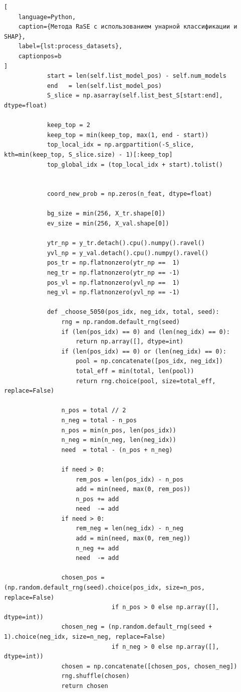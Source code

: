 \documentclass[12pt,a4paper]{article}
\begin{document}
\begin{lstlisting}[
    language=Python,
    caption={Метода RaSE с использованием унарной классификации и SHAP},
    label={lst:process_datasets},
    captionpos=b
]
            start = len(self.list_model_pos) - self.num_models
            end   = len(self.list_model_pos)
            S_slice = np.asarray(self.list_best_S[start:end], dtype=float)

            keep_top = 2
            keep_top = min(keep_top, max(1, end - start))
            top_local_idx = np.argpartition(-S_slice, kth=min(keep_top, S_slice.size) - 1)[:keep_top]
            top_global_idx = (top_local_idx + start).tolist()


            coord_new_prob = np.zeros(n_feat, dtype=float)

            bg_size = min(256, X_tr.shape[0])
            ev_size = min(256, X_val.shape[0])

            ytr_np = y_tr.detach().cpu().numpy().ravel()
            yvl_np = y_val.detach().cpu().numpy().ravel()
            pos_tr = np.flatnonzero(ytr_np ==  1)
            neg_tr = np.flatnonzero(ytr_np == -1)
            pos_vl = np.flatnonzero(yvl_np ==  1)
            neg_vl = np.flatnonzero(yvl_np == -1)

            def _choose_5050(pos_idx, neg_idx, total, seed):
                rng = np.random.default_rng(seed)
                if (len(pos_idx) == 0) and (len(neg_idx) == 0):
                    return np.array([], dtype=int)
                if (len(pos_idx) == 0) or (len(neg_idx) == 0):
                    pool = np.concatenate([pos_idx, neg_idx])
                    total_eff = min(total, len(pool))
                    return rng.choice(pool, size=total_eff, replace=False)

                n_pos = total // 2
                n_neg = total - n_pos
                n_pos = min(n_pos, len(pos_idx))
                n_neg = min(n_neg, len(neg_idx))
                need  = total - (n_pos + n_neg)

                if need > 0:
                    rem_pos = len(pos_idx) - n_pos
                    add = min(need, max(0, rem_pos))
                    n_pos += add
                    need  -= add
                if need > 0:
                    rem_neg = len(neg_idx) - n_neg
                    add = min(need, max(0, rem_neg))
                    n_neg += add
                    need  -= add

                chosen_pos = (np.random.default_rng(seed).choice(pos_idx, size=n_pos, replace=False)
                              if n_pos > 0 else np.array([], dtype=int))
                chosen_neg = (np.random.default_rng(seed + 1).choice(neg_idx, size=n_neg, replace=False)
                              if n_neg > 0 else np.array([], dtype=int))
                chosen = np.concatenate([chosen_pos, chosen_neg])
                rng.shuffle(chosen)
                return chosen


\end{lstlisting}
\end{document}
